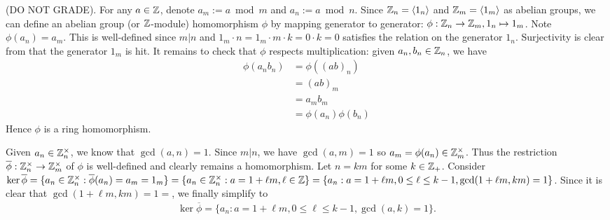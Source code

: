 \documentclass[12pt]{article}
\begin{document}
\begin{problem}[4] (DO NOT GRADE). 
For any $ a \in \mathbb{Z}$, denote $ a_m:= a \bmod m$ and $ a_n := a \bmod n$. Since $ \mathbb{Z}_n = \langle 1_n \rangle$ and $ \mathbb{Z}_m = \langle 1_m \rangle$ as abelian groups, we can define an abelian group (or $ \mathbb{Z}$-module) homomorphism $ \phi$ by mapping generator to generator: $ \phi: \mathbb{Z}_n \to \mathbb{Z}_m, 1_n \mapsto 1_m$. Note $ \phi(a_n) = a_m$. This is well-defined since $ m|n$ and $ 1_m \cdot n = 1_m \cdot m \cdot k = 0 \cdot k = 0$ satisfies the relation on the generator $ 1_n$. Surjectivity is clear from that the generator $ 1_m$  is hit. It remains to check that $ \phi$ respects multiplication: given $ a_n,b_n \in \mathbb{Z}_n$, we have
\begin{align*}
	\phi(a_n b_n) &= \phi((ab)_n) \\
	&= (ab)_m\\
	&= a_m b_m \\
	&= \phi(a_n) \phi(b_n) 
\end{align*}
Hence $ \phi$ is a ring homomorphism.

Given $ a_n \in \mathbb{Z}_n^{ \times }$, we know that $ \gcd ( a,n) =1$. Since $ m|n$, we have  $ \gcd ( a,m)=1 $ so $ a_m = \phi(a_n) \in \mathbb{Z}_m^{ \times }$. Thus the restriction $ \overline{\phi}: \mathbb{Z}_n^{ \times } \to \mathbb{Z}_m^{ \times }$ of $ \phi$ is well-defined and clearly remains a homomorphism. Let $ n=km$ for some $ k \in \mathbb{Z}_{+}$. Consider $ \ker \overline{\phi} = \{a_n \in \mathbb{Z}_n^{ \times }: \overline{\phi}(a_n) = a_m =1_m\} = \{a_n \in \mathbb{Z}_n^{ \times }: a = 1+\ell m, \ell \in \mathbb{Z}\} = \{a_n: a = 1+ \ell m , 0\leq \ell \leq k-1, \gcd ( 1+\ell m,km)=1 \} $. Since it is clear that $ \gcd ( 1+\ell m, km) =1 =$, we finally simplify to
\begin{align*}
	\ker \overline{\phi} = \{a_n: a=1+\ell m, 0\leq \ell \leq k-1, \gcd (a, k) =1\}.
\end{align*}
\end{problem}
\end{document}
